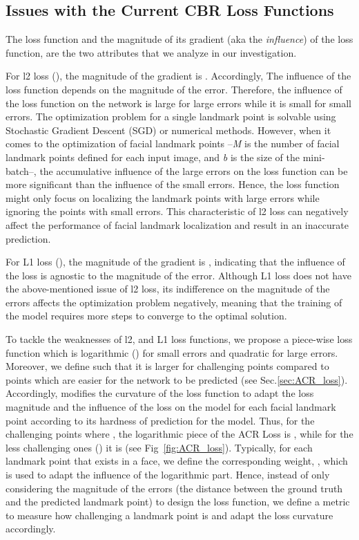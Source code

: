 \documentclass[a4paper,conference]{IEEEtran}
\begin{document}
\subsection{Issues with the Current CBR Loss Functions}
The loss function and the magnitude of its gradient (aka the \textit{influence}) of the loss function, are the two attributes that we analyze in our investigation. 

For l2 loss (), the magnitude of the gradient is . Accordingly, The influence of the loss function depends on the magnitude of the error. Therefore, the influence of the loss function on the network is large for large errors while it is small for small errors. The optimization problem for a single landmark point is solvable using Stochastic Gradient Descent (SGD) or numerical methods. However, when it comes to the optimization of  facial landmark points --\textit{M} is the number of facial landmark points defined for each input image, and \textit{b} is the size of the mini-batch--, the accumulative influence of the large errors on the loss function can be more significant than the influence of the small errors. Hence, the loss function might only focus on localizing the landmark points with large errors while ignoring the points with small errors. This characteristic of l2 loss can negatively affect the performance of facial landmark localization and result in an inaccurate prediction. 



For L1 loss (), the magnitude of the gradient is , indicating that the influence of the loss is agnostic to the magnitude of the error. Although L1 loss does not have the above-mentioned issue of l2 loss, its indifference on the magnitude of the errors affects the optimization problem negatively, meaning that the training of the model requires more steps to converge to the optimal solution.

To tackle the weaknesses of l2, and L1 loss functions, we propose a piece-wise loss function which is logarithmic () for small errors and quadratic for large errors. Moreover, we define  such that it is larger for challenging points compared to points which are easier for the network to be predicted (see Sec.\ref{sec:ACR_loss}). Accordingly,  modifies the curvature of the loss function to adapt the loss magnitude and the influence of the loss on the model for each facial landmark point according to its hardness of prediction for the model. Thus, for the challenging points where , the logarithmic piece of the ACR Loss is , while for the less challenging ones () it is  (see Fig~\ref{fig:ACR_loss}). Typically, for each landmark point that exists in a face, we define the corresponding weight, , which is used to adapt the influence of the logarithmic part. Hence, instead of only considering the magnitude of the errors (the distance between the ground truth and the predicted landmark point) to design the loss function, we define a metric to measure how challenging a landmark point is and adapt the loss curvature accordingly.
\end{document}
